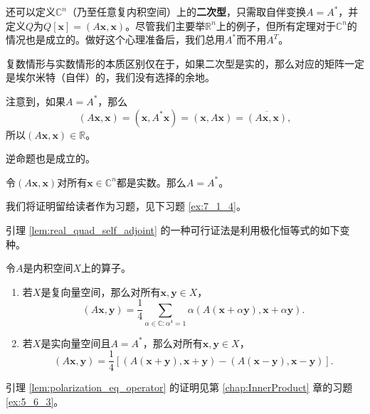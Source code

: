 还可以定义$\mathbb{C}^n$（乃至任意复内积空间）上的{\bf 二次型}，只需取自伴变换$A=A^*$，并定义$Q$为$Q[\mathbf{x}]=(A\mathbf{x},\mathbf{x})$。尽管我们主要举$\mathbb{R}^n$上的例子，但所有定理对于$\mathbb{C}^n$的情况也是成立的。做好这个心理准备后，我们总用$A^*$而不用$A^T$。

复数情形与实数情形的本质区别仅在于，如果二次型是实的，那么对应的矩阵一定是埃尔米特（自伴）的，我们没有选择的余地。

注意到，如果$A=A^*$，那么
\[(A\mathbf{x},\mathbf{x})=(\mathbf{x},A^*\mathbf{x})=(\mathbf{x},A\mathbf{x})=\overline{(A\mathbf{x},\mathbf{x})},\]
所以$(A\mathbf{x},\mathbf{x})\in\mathbb{R}$。

逆命题也是成立的。

\begin{lemma}\label{lem:real_quad_self_adjoint}
    令$(A\mathbf{x},\mathbf{x})$对所有$\mathbf{x}\in\mathbb{C}^n$都是实数。那么$A=A^*$。
\end{lemma}

我们将证明留给读者作为习题，见下习题 \ref{ex:7_1_4}。

引理 \ref{lem:real_quad_self_adjoint} 的一种可行证法是利用极化恒等式的如下变种。

\begin{lemma}\label{lem:polarization_eq_operator}
    令$A$是内积空间$X$上的算子。
    \begin{enumerate}
        \item 若$X$是复向量空间，那么对所有$\mathbf{x},\mathbf{y}\in X$，
        \[(A\mathbf{x},\mathbf{y})=\frac{1}{4}\sum_{\alpha\in\mathbb{C}:\alpha^4=1}\alpha(A(\mathbf{x}+\alpha\mathbf{y}),\mathbf{x}+\alpha\mathbf{y}).\]
        \item 若$X$是实向量空间且$A=A^*$，那么对所有$\mathbf{x},\mathbf{y}\in X$，
        \[(A\mathbf{x},\mathbf{y})=\frac{1}{4}\left[(A(\mathbf{x}+\mathbf{y}),\mathbf{x}+\mathbf{y})-(A(\mathbf{x}-\mathbf{y}),\mathbf{x}-\mathbf{y})\right].\]
    \end{enumerate}
\end{lemma}

引理 \ref{lem:polarization_eq_operator} 的证明见第 \ref{chap:InnerProduct} 章的习题 \ref{ex:5_6_3}。

